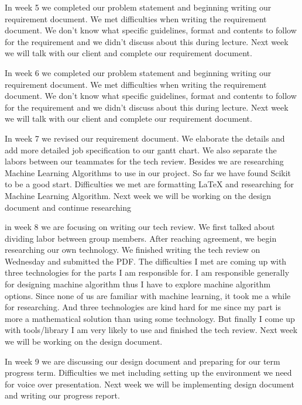 \documentclass[letterpaper, 10pt,titlepage]{article}
\begin{document}
\par In week 5 we completed our problem statement and beginning writing our requirement document. We met difficulties when writing the requirement document. We don't know what specific guidelines, format and contents to follow for the requirement and we didn't discuss about this during lecture. Next week we will talk with our client and complete our requirement document.

\par In week 6 we completed our problem statement and beginning writing our requirement document. We met difficulties when writing the requirement document. We don't know what specific guidelines, format and contents to follow for the requirement and we didn't discuss about this during lecture. Next week we will talk with our client and complete our requirement document.

\par In week 7 we revised our requirement document. We elaborate the details and add more detailed job specification to our gantt chart. We also separate the labors between our teammates for the tech review. Besides we are researching Machine Learning Algorithms to use in our project. So far we have found Scikit to be a good start. Difficulties we met are formatting LaTeX and researching for Machine Learning Algorithm. Next week we will be working on the design document and continue researching

\par in week 8 we are focusing on writing our tech review. We first talked about dividing labor between group members. After reaching agreement, we begin researching our own technology. We finished writing the tech review on Wednesday and submitted the PDF. The difficulties I met are coming up with three technologies for the parts I am responsible for. I am responsible generally for designing machine algorithm thus I have to explore machine algorithm options. Since none of us are familiar with machine learning, it took me a while for researching. And three technologies are kind hard for me since my part is more a mathematical solution than using some technology. But finally I come up with tools/library I am very likely to use and finished the tech review. Next week we will be working on the design document.

\par In week 9 we are discussing our design document and preparing for our term progress term. Difficulties we met including setting up the environment we need for voice over presentation. Next week we will be implementing design document and writing our progress report.
\end{document}
